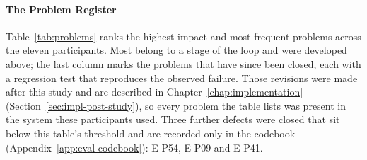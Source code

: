 \paragraph{The Problem Register}
\label{sec:eval-problems}

Table~\ref{tab:problems} ranks the highest-impact and most frequent problems across the eleven participants. Most belong to a stage of the loop and were developed above; the last column marks the problems that have since been closed, each with a regression test that reproduces the observed failure. Those revisions were made after this study and are described in Chapter~\ref{chap:implementation} (Section~\ref{sec:impl-post-study}), so every problem the table lists was present in the system these participants used. Three further defects were closed that sit below this table's threshold and are recorded only in the codebook (Appendix~\ref{app:eval-codebook}): E-P54, E-P09 and E-P41.

